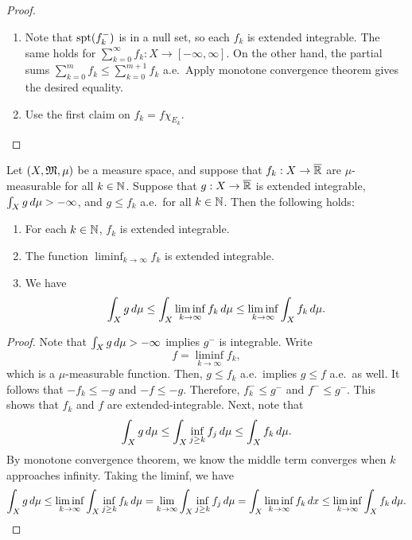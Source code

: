 \documentclass[a4paper]{article}
\renewcommand{\suminfk}{\sum_{k=0}^\infty}
\renewcommand{\sumk}{\sum_{k=0}}
\begin{document}
\begin{proof}
  \begin{enumerate}
    \item Note that $\operatorname{spt}(f_k^-)$ is in a null set, so each $f_k$ is
          extended integrable. The same holds for $\suminfk f_k : X \to
          [-\infty, \infty]$. On the other hand, the partial sums $\sumk^m
          f_k \leq \sumk^{m+1} f_k$ a.e.\ Apply monotone convergence
          theorem gives the desired equality.

    \item Use the first claim on $f_k = f \chi_{E_k}$.
  \end{enumerate}
\end{proof}

\begin{thm}
  Let $(X, \mathfrak{M}, \mu)$ be a measure space, and suppose
  that $f_k : X \to \overline{\mathbb{R}}$ are $\mu$-measurable
  for all $k \in \mathbb{N}$. Suppose that $g : X \to \overline{\mathbb{R}}$ is
  extended integrable, $\int_X g \, d \mu > - \infty$, and
  $g \leq f_k$ a.e.\ for all $k \in \mathbb{N}$. Then the following
  holds:
  \begin{enumerate}
    \item For each $k \in \mathbb{N}$, $f_k$ is extended integrable.
    \item The function $\liminf_{k \to \infty} f_k$ is extended
          integrable.
    \item We have
          \[
            \int_X g \, d \mu \leq \int_X \liminf_{k \to \infty}
            f_k \, d \mu \leq \liminf_{k \to \infty} \int_X f_k \, d \mu.
          \]
  \end{enumerate}
\end{thm}

\begin{proof}
  Note that $\int_X g \, d \mu > - \infty$ implies $g^-$ is integrable.
  Write
  \[
    f = \liminf_{k \to \infty} f_k,
  \]
  which is a $\mu$-measurable function. Then, $g \leq f_k$ a.e.\ implies
  $g \leq f$ a.e.\ as well. It follows that $-f_k \leq -g$ and $-f \leq
  -g$. Therefore, $f_k^- \leq g^-$ and $f^- \leq g^-$. This shows that
  $f_k$ and $f$ are extended-integrable. Next, note that
  \[
    \int_X g \, d \mu \leq \int_X \inf_{j \geq k} f_j \, d \mu
    \leq \int_X f_k \, d \mu.
  \]
  By monotone convergence theorem, we know the middle term converges when
  $k$ approaches infinity. Taking the liminf, we have
  \[
    \int_X g \, d \mu
    \leq
    \liminf_{k \to \infty} \int_X \inf_{j \geq k} f_k \, d \mu
    = \lim_{k \to \infty} \int_X \inf_{j \geq k} f_j \, d \mu
    = \int_X \liminf_{k \to \infty} f_k \, d x
    \leq \liminf_{k \to \infty} \int_X f_k \, d \mu.
  \]
\end{proof}
\end{document}
